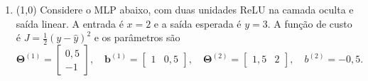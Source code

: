 \documentclass[11pt,a4paper]{article}
\begin{document}
\begin{enumerate}[1)]
\begin{minipage}[t]{0.47\linewidth}
\begin{enumerate}[a)]
    \item $\hat{\mathbf{y}} = (0{,}953;\ 0{,}119)$
    \item $\hat{\mathbf{y}} = (0{,}998;\ 0{,}881)$
    \item $\hat{\mathbf{y}} = (0{,}500;\ 0{,}982)$
    \item $\hat{\mathbf{y}} = (0{,}982;\ 0{,}500)$
\end{enumerate}
\end{minipage}\hfill
\begin{minipage}[t]{0.47\linewidth}
\begin{enumerate}[a)]
\setcounter{enumii}{4}
    \item $\hat{\mathbf{y}} = (0{,}953;\ 0{,}500)$
    \item $\hat{\mathbf{y}} = (0{,}998;\ 0{,}500)$
    \item $\hat{\mathbf{y}} = (0{,}982;\ 0{,}982)$
    \item $\hat{\mathbf{y}} = (0{,}119;\ 0{,}953)$
\end{enumerate}
\end{minipage}

\item (1{,}0) Considere o MLP abaixo, com duas unidades ReLU na camada oculta e saída linear. A entrada é $x = 2$ e a saída esperada é $y = 3$. A função de custo é $J = \tfrac{1}{2}(y - \hat{y})^2$ e os parâmetros são
\[
\mathbf{\Theta}^{(1)} = \begin{bmatrix} 0{,}5 \\ -1 \end{bmatrix}, \quad
\mathbf{b}^{(1)} = \begin{bmatrix} 1 & 0{,}5 \end{bmatrix}, \quad
\mathbf{\Theta}^{(2)} = \begin{bmatrix} 1{,}5 & 2 \end{bmatrix}, \quad
b^{(2)} = -0{,}5 .
\]


\end{enumerate}
\end{document}
